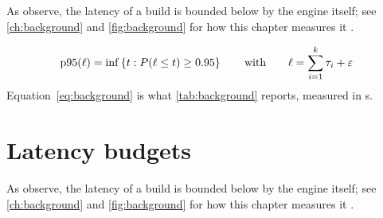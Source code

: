 As \textcite{nielsen1993} observe, the latency \latency{} of a build is
bounded below by the engine itself; see \cref{ch:background} and \cref{fig:background}
for how this chapter measures it \parencite{tectonic2024}.

\begin{equation}\label{eq:background}
  \operatorname{p95}(\ell) = \inf\left\{ t : P(\ell \le t) \ge 0.95 \right\}
  \qquad \text{with} \qquad \ell = \sum_{i=1}^{k} \tau_i + \varepsilon
\end{equation}
Equation~\eqref{eq:background} is what \cref{tab:background} reports, measured in \si{\second}.

\section{Latency budgets}\label{sec:background-3}
\lipsum[99-112]

As \textcite{tectonic2024} observe, the latency \latency{} of a build is
bounded below by the engine itself; see \cref{ch:background} and \cref{fig:background}
for how this chapter measures it \parencite{kleppmann2019}.

